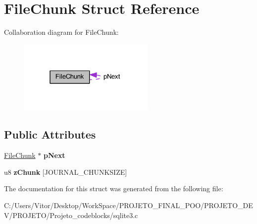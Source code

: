 \hypertarget{struct_file_chunk}{\section{File\-Chunk Struct Reference}
\label{struct_file_chunk}
}


Collaboration diagram for File\-Chunk\-:\nopagebreak
\begin{figure}[H]
\begin{center}
\leavevmode
\includegraphics[width=187pt]{struct_file_chunk__coll__graph}
\end{center}
\end{figure}
\subsection*{Public Attributes}
\begin{DoxyCompactItemize}
\item 
\hypertarget{struct_file_chunk_ad2d0d170afc7ce1e239e8716852e247b}{\hyperlink{struct_file_chunk}{File\-Chunk} $\ast$ {\bfseries p\-Next}}\label{struct_file_chunk_ad2d0d170afc7ce1e239e8716852e247b}

\item 
\hypertarget{struct_file_chunk_ada06a9958ee6b82a6c2b15c29f847d19}{u8 {\bfseries z\-Chunk} \mbox{[}J\-O\-U\-R\-N\-A\-L\-\_\-\-C\-H\-U\-N\-K\-S\-I\-Z\-E\mbox{]}}\label{struct_file_chunk_ada06a9958ee6b82a6c2b15c29f847d19}

\end{DoxyCompactItemize}


The documentation for this struct was generated from the following file\-:\begin{DoxyCompactItemize}
\item 
C\-:/\-Users/\-Vitor/\-Desktop/\-Work\-Space/\-P\-R\-O\-J\-E\-T\-O\-\_\-\-F\-I\-N\-A\-L\-\_\-\-P\-O\-O/\-P\-R\-O\-J\-E\-T\-O\-\_\-\-D\-E\-V/\-P\-R\-O\-J\-E\-T\-O/\-Projeto\-\_\-codeblocks/sqlite3.\-c\end{DoxyCompactItemize}
